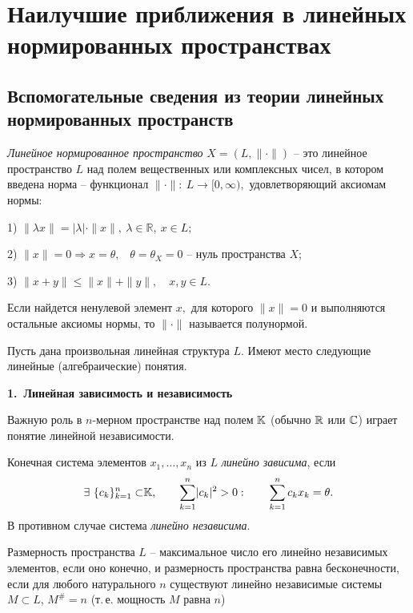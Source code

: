 
 \chapter{Наилучшие приближения в линейных нормированных пространствах}

 \section{Вспомогательные сведения из теории линейных \\ нормированных
 пространств}

{\it Линейное нормированное пространство} $X=(L,\|\cdot\|)$ -- это
 линейное пространство $L$ над полем вещественных или комплексных чисел,
 в котором введена норма -- функционал $\|\cdot\|:\ L\to [0,\infty),$
 удовлетворяющий аксиомам нормы:

1) $\|\lambda x\|=|\lambda|\cdot\|x\|,\ \lambda\in \mathbb R,\ x\in L;$

2) $\|x\|=0 \Rightarrow x=\theta,$
\ $\theta=\theta_X=0$ -- нуль пространства $X$;

3) $\|x+y\|\le \|x\|+\|y\|,\quad x,y\in L.$

 Если найдется ненулевой элемент $x,$ для которого $\|x\|=0$ и выполняются
 остальные аксиомы нормы, то $\|\cdot\|$ называется полунормой.

 Пусть дана произвольная линейная структура $L.$
 Имеют место следующие линейные (алгебраические) понятия.

\vspace{5mm}
{\bf 1.~Линейная зависимость и независимость}
\vspace{5mm}

Важную роль в $n$-мерном
 пространстве над полем $\mathbb{K}$ (обычно $\mathbb{R}$ или $\mathbb{C}$) играет понятие линейной независимости.

 Конечная система элементов $x_1,\ldots,x_n$ из $L$ {\it линейно
 зависима}, если
 $$
 \exists\ {\{c_k\}_{k=1}^n \subset} \mathbb{K},\qquad {\sum\limits_{k=1}^n}|c_k|^2>0:\qquad \sum\limits_{k=1}^n
 c_kx_k=\theta.
 $$
 В противном случае система {\it линейно независима}.

 Размерность {пространства $L$} -- максимальное число {его} линейно независимых
 элементов, если оно конечно, и размерность пространства
 равна бесконечности, если для любого натурального $n$
 существуют линейно независимые системы $M \subset L$, {$M^{\#}=n$}
 {(т.\,е. мощность $M$ равна $n$)}

